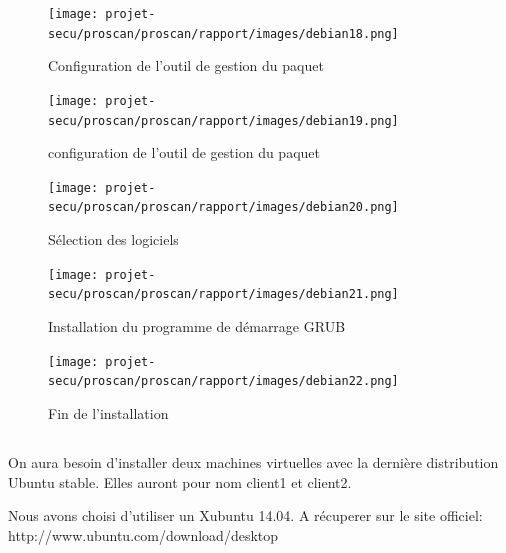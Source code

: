 \documentclass[11pt,a4paper,titlepage, oneside]{article}
\begin{document}
	\newpage
                \begin{figure}[h]
                        \centering
                        \texttt{[image: projet-secu/proscan/proscan/rapport/images/debian18.png]}
                        \caption{Configuration de l'outil de gestion du paquet}
                \end{figure}

	\newpage
                \begin{figure}[h]
                        \centering
                        \texttt{[image: projet-secu/proscan/proscan/rapport/images/debian19.png]}
                        \caption{configuration de l'outil de gestion du paquet}
                \end{figure}

	\newpage
                \begin{figure}[h]
                        \centering
                        \texttt{[image: projet-secu/proscan/proscan/rapport/images/debian20.png]}
                        \caption{Sélection des logiciels}
                \end{figure}

	\newpage
                \begin{figure}[h]
                        \centering
                        \texttt{[image: projet-secu/proscan/proscan/rapport/images/debian21.png]}
                        \caption{Installation du programme de démarrage GRUB}
                \end{figure}

	\newpage
                \begin{figure}[h]
                        \centering
                        \texttt{[image: projet-secu/proscan/proscan/rapport/images/debian22.png]}
                        \caption{Fin de l'installation}
                \end{figure}
\subsection{{\color{blue}{Installation du client ubuntu}}}
\paragraph{}
	        On aura besoin d'installer deux machines virtuelles avec la dernière distribution Ubuntu stable. Elles auront pour nom client1 et client2.

		Nous avons choisi d'utiliser un Xubuntu 14.04. A récuperer sur le site officiel: http://www.ubuntu.com/download/desktop
		
\end{document}

